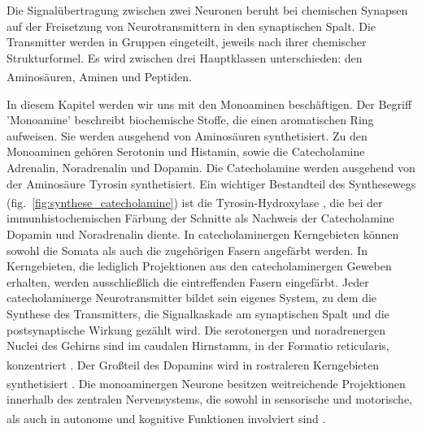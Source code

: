 
Die Signalübertragung zwischen zwei Neuronen beruht bei chemischen Synapsen auf der Freisetzung von Neurotransmittern in den synaptischen Spalt.
Die Transmitter werden in Gruppen eingeteilt, jeweils nach ihrer chemischer Strukturformel. Es wird zwischen drei Hauptklassen unterschieden: den Aminosäuren, Aminen und Peptiden. \textsuperscript{\cite[Kap.~6]{neurowissenschaften_baer}}

In diesem Kapitel werden wir uns mit den Monoaminen beschäftigen.
Der Begriff 'Monoamine'  beschreibt biochemische Stoffe, die einen aromatischen Ring aufweisen. Sie werden ausgehend von Aminosäuren synthetisiert. Zu den Monoaminen gehören Serotonin und Histamin, sowie die Catecholamine Adrenalin, Noradrenalin und Dopamin.
Die Catecholamine werden ausgehend von der Aminosäure Tyrosin synthetisiert. Ein wichtiger Bestandteil des Synthesewegs (fig.~\ref{fig:synthese_catecholamine}) ist die Tyrosin-Hydroxylase \textsuperscript{\cite[Kap.~13]{kandel2013principles}}, die bei der immunhistochemischen Färbung der Schnitte als Nachweis der Catecholamine Dopamin und Noradrenalin diente. In catecholaminergen Kerngebieten können sowohl die Somata als auch die zugehörigen Fasern angefärbt werden. In Kerngebieten, die lediglich Projektionen aus den catecholaminergen Geweben erhalten, werden ausschließlich die eintreffenden Fasern eingefärbt.
Jeder catecholaminerge Neurotransmitter bildet sein eigenes System, zu dem die Synthese des Transmitters, die Signalkaskade am synaptischen Spalt und die postsynaptische Wirkung gezählt wird. Die serotonergen und noradrenergen Nuclei des Gehirns sind im caudalen Hirnstamm, in der Formatio reticularis, konzentriert \textsuperscript{\cite[Kap.~7]{trepel2011neuroanatomie}}.
Der Großteil des Dopamins wird in rostraleren Kerngebieten synthetisiert \textsuperscript{\cite[Kap.~63]{kandel2013principles}}.
Die monoaminergen Neurone besitzen weitreichende Projektionen innerhalb des zentralen Nervensystems, die sowohl in sensorische und motorische, als auch in autonome und kognitive Funktionen involviert sind \textsuperscript{\cite[Kap.~9]{crossman2014neuroanatomy}}.

